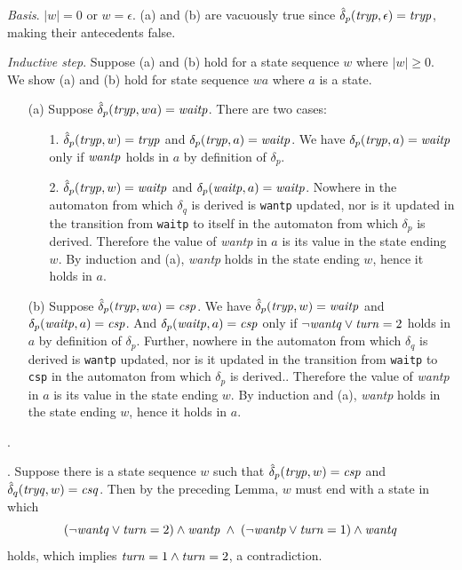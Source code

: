 \documentclass[12pt]{article}
\newcommand{\id}[1]{\mbox{\it #1\/}}
\begin{document}
\vspace{0.5em}
{\em Basis\/}. $|w|=0$ or $w=\epsilon$.
(a) and (b) are vacuously true since $\hat{\delta}_p(\id{tryp},\epsilon)=\id{tryp}$, making
their antecedents false.

\vspace{1em}
{\em Inductive step\/}.
Suppose (a) and (b) hold for a state sequence $w$ where $|w|\geq 0$.
We show (a) and (b) hold for state sequence $wa$ where $a$ is a state.

\begin{enumerate}

\item[(a)]  Suppose $\hat{\delta}_p(\id{tryp},wa)=\id{waitp}$.
There are two cases:
\begin{enumerate}
\item[1.]  $\hat{\delta}_p(\id{tryp},w)=\id{tryp}$ and $\delta_p(\id{tryp},a)=\id{waitp}$.
We have $\delta_p(\id{tryp},a)=\id{waitp}$ only if $\id{wantp}$ holds in $a$ by definition of $\delta_p$.
\item[2.]  $\hat{\delta}_p(\id{tryp},w)=\id{waitp}$ and $\delta_p(\id{waitp},a)=\id{waitp}$.
Nowhere in the automaton from which $\delta_q$ is derived is {\tt wantp} updated, nor is it
updated in the transition from {\tt waitp} to itself in the automaton from which $\delta_p$ is derived.
Therefore the value of {\em wantp\/} in $a$ is its value in the state ending $w$.
By induction and (a), {\em wantp\/} holds in the state ending $w$, hence it holds in $a$.
\end{enumerate}
\item[(b)]  Suppose $\hat{\delta}_p(\id{tryp},wa)=\id{csp}$.
We have $\hat{\delta}_p(\id{tryp},w)=\id{waitp}$ and $\delta_p(\id{waitp},a)=\id{csp}$.
And $\delta_p(\id{waitp},a)=\id{csp}$ only if $\neg\id{wantq}\vee\id{turn}=2$ holds in $a$ by definition
of $\delta_p$.
Further, nowhere in the automaton from which $\delta_q$ is derived is {\tt wantp} updated, nor is it
updated in the transition from {\tt waitp} to {\tt csp} in the automaton from which $\delta_p$ is derived..
Therefore the value of {\em wantp\/} in $a$ is its value in the state ending $w$.
By induction and (a), {\em wantp\/} holds in the state ending $w$, hence it holds in $a$.
\end{enumerate}
.

\vspace{1em}
.
Suppose there is a state sequence $w$ such that $\hat{\delta}_p(\id{tryp},w)=\id{csp}$
and $\hat{\delta}_q(\id{tryq},w)=\id{csq}$.
Then by the preceding Lemma, $w$ must end with a state in which
\[(\neg\id{wantq}\vee\id{turn}=2)\wedge\id{wantp}\;\wedge\;
(\neg\id{wantp}\vee\id{turn}=1)\wedge\id{wantq}
\]
holds, which implies $\id{turn}=1\wedge\id{turn}=2$, a contradiction.
\end{document}
